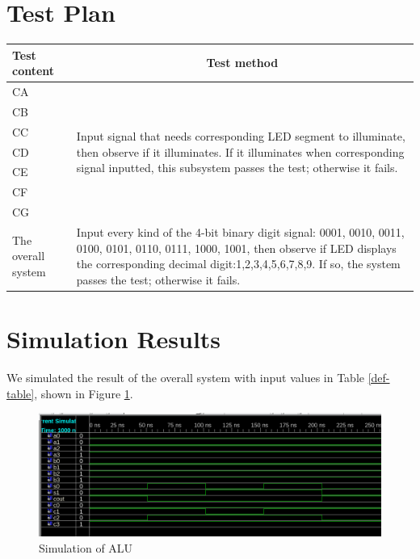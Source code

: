 \documentclass{article}
\begin{document}
\newpage

\section{Test Plan}
\begin{center}
\begin{tabular}{|m{3cm}<{\centering}|m{10cm}|}
\hline
Test content & \multicolumn{1}{c|}{Test method} \\\hline
CA & \multirow{7}{10cm}{Input signal that needs corresponding LED segment to illuminate, then observe if it illuminates. If it illuminates when corresponding signal inputted, this subsystem passes the test; otherwise it fails.} \\\cline{1-1}
CB & \\\cline{1-1}
CC & \\\cline{1-1}
CD & \\\cline{1-1}
CE & \\\cline{1-1}
CF & \\\cline{1-1}
CG & \\\hline
The overall system & Input every kind of the 4-bit binary digit signal: 0001, 0010, 0011, 0100, 0101, 0110, 0111, 1000, 1001, then observe if LED displays the corresponding decimal digit:1,2,3,4,5,6,7,8,9. If so, the system passes the test; otherwise it fails. \\\hline
\end{tabular}
\end{center}

\section{Simulation Results}
We simulated the result of the overall system with input values in Table \ref{def-table}, shown in Figure \ref{simulation}.

\begin{figure}[!htbp]
\centering
\includegraphics[width=0.9\linewidth]{simulation.png}
\caption{Simulation of ALU}
\label{simulation}
\end{figure}
\end{document}

